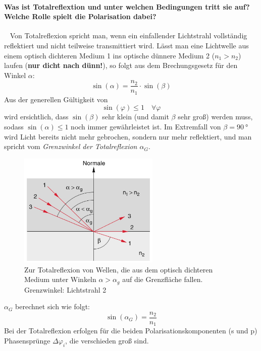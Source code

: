 \documentclass[a4paper, 11pt, ngerman, parskip=half-]{scrartcl}
\begin{document}
\paragraph{Was ist Totalreflextion und unter welchen Bedingungen tritt sie auf? Welche Rolle spielt die Polarisation dabei?}~
%
%
Von Totalreflexion spricht man, wenn ein einfallender Lichtstrahl vollständig reflektiert und nicht teilweise transmittiert wird.
Lässt man eine Lichtwelle aus einem optisch dichteren Medium 1 ins optische dünnere Medium 2 ($n_1 > n_2$) laufen (\textbf{nur dicht nach dünn!}), so folgt aus dem Brechungsgesetz für den Winkel $\alpha$:
%
\[\sin(\alpha) = \frac{n_2}{n_1} \cdot \sin(\beta)\]
%
Aus der generellen Gültigkeit von
%
\[\sin(\varphi) \leq 1 \quad \forall \varphi\]
%
wird ersichtlich, dass $\sin(\beta)$ sehr klein (und damit $\beta$ sehr groß) werden muss, sodass
$\sin(\alpha) \leq 1$ noch immer gewährleistet ist. Im Extremfall von $\beta = \SI{90}{\degree}$
wird Licht bereits nicht mehr gebrochen, sondern nur mehr reflektiert, und man spricht vom
\textit{Grenzwinkel der Totalreflexion $\alpha_G$}.
%
\begin{figure}[H]
    \centering
    \begin{samepage}
        \includegraphics[width=0.6\textwidth]{image/15/totalreflexion.jpg}
        \caption{Zur Totalreflexion von Wellen, die aus dem optisch
            dichteren Medium unter Winkeln $\alpha > \alpha_g$ auf die Grenzfläche fallen. Grenzwinkel: Lichtstrahl 2}
        \label{fig:totalreflexion}
    \end{samepage}
\end{figure}
%
$\alpha_G$ berechnet sich wie folgt:
\begin{equation}
    \label{eq:grenzwinkel_totalreflexion}
    \sin(\alpha_G) = \frac{n_2}{n_1}
\end{equation}
%
Bei der Totalreflexion erfolgen für die beiden Polarisationskomponenten (s und p) Phasensprünge $\Delta \varphi_i$, die verschieden groß sind.\\
\end{document}

